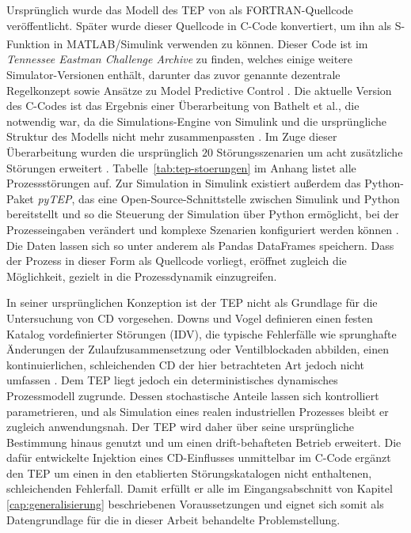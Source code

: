 %
Ursprünglich wurde das Modell des \ac{TEP} von \cite{downs.1993} als FORTRAN-Quellcode veröffentlicht. Später wurde dieser Quellcode in C-Code konvertiert, um ihn als S-Funktion in MATLAB\textsuperscript{\textregistered}/Simulink\textsuperscript{\textregistered} verwenden zu können. Dieser Code ist im \textit{Tennessee Eastman Challenge Archive} zu finden, welches einige weitere Simulator-Versionen enthält, darunter das zuvor genannte dezentrale Regelkonzept sowie Ansätze zu Model Predictive Control \cite{ricker.2005}. Die aktuelle Version des C-Codes ist das Ergebnis einer Überarbeitung von Bathelt et al., die notwendig war, da die Simulations-Engine von Simulink und die ursprüngliche Struktur des Modells nicht mehr zusammenpassten \cite{bathelt.2015}. Im Zuge dieser Überarbeitung wurden die ursprünglich $20$ Störungsszenarien um acht zusätzliche Störungen erweitert \cite{bathelt.2015}. Tabelle~\ref{tab:tep-stoerungen} im Anhang listet alle Prozessstörungen auf. Zur Simulation in Simulink existiert außerdem das Python-Paket \textit{pyTEP}, das eine Open-Source-Schnittstelle zwischen Simulink und Python bereitstellt und so die Steuerung der Simulation über Python ermöglicht, bei der Prozesseingaben verändert und komplexe Szenarien konfiguriert werden können \cite{reinartz.2022}. Die Daten lassen sich so unter anderem als Pandas DataFrames speichern. Dass der Prozess in dieser Form als Quellcode vorliegt, eröffnet zugleich die Möglichkeit, gezielt in die Prozessdynamik einzugreifen. \par
%
In seiner ursprünglichen Konzeption ist der \ac{TEP} nicht als Grundlage für die Untersuchung von \ac{CD} vorgesehen. Downs und Vogel definieren einen festen Katalog vordefinierter Störungen (IDV), die typische Fehlerfälle wie sprunghafte Änderungen der Zulaufzusammensetzung oder Ventilblockaden abbilden, einen kontinuierlichen, schleichenden \ac{CD} der hier betrachteten Art jedoch nicht umfassen \cite{downs.1993}. 
Dem \ac{TEP} liegt jedoch ein deterministisches dynamisches Prozessmodell zugrunde. Dessen stochastische Anteile lassen sich kontrolliert parametrieren, und als Simulation eines realen industriellen Prozesses bleibt er zugleich anwendungsnah. 
Der \ac{TEP} wird daher über seine ursprüngliche Bestimmung hinaus genutzt und um einen drift-behafteten Betrieb erweitert. Die dafür entwickelte Injektion eines \ac{CD}-Einflusses unmittelbar im C-Code ergänzt den \ac{TEP} um einen in den etablierten Störungskatalogen nicht enthaltenen, schleichenden Fehlerfall. 
Damit erfüllt er alle im Eingangsabschnitt von Kapitel \ref{cap:generalisierung} beschriebenen Voraussetzungen und eignet sich somit als Datengrundlage für die in dieser Arbeit behandelte Problemstellung. \par
